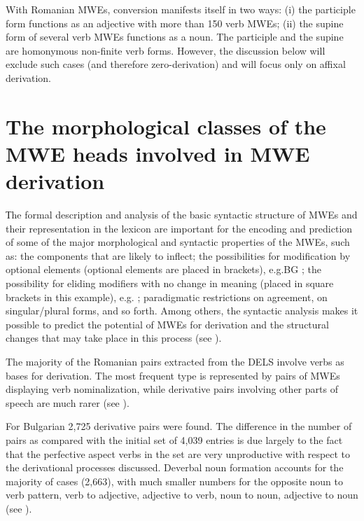 \documentclass[output=paper]{langsci/langscibook}
\begin{document}
With Romanian MWEs, conversion manifests itself in two ways: (i) the
participle form functions as an adjective with more than 150 verb MWEs;
(ii) the supine form of several verb MWEs functions as a noun. The
participle and the supine are homonymous non-finite verb forms.
However, the discussion below will exclude such cases (and therefore
zero-derivation) and will focus only on affixal derivation.



\section{The morphological classes of the MWE heads involved in
MWE derivation}
\label{section5}


Тhe formal description and analysis of the basic syntactic structure of
MWEs and their representation in the lexicon are important for the
encoding and prediction of some of the major morphological and
syntactic properties of the MWEs, such as: the components that are likely to
inflect; the possibilities for modification by optional elements
(optional elements are placed in brackets), e.g.\@ BG ; the possibility for eliding modifiers
with no change in meaning (placed in square brackets in this example),
e.g.\@ 
{}; paradigmatic
restrictions on agreement, on singular/plural forms, and so forth.
Among others, the syntactic analysis makes it possible to predict the
potential of MWEs for derivation and the structural changes that may take place
in this process (see ).



The majority of the Romanian pairs extracted from the DELS involve verbs
as bases for derivation. The most frequent type is represented by pairs
of MWEs displaying verb nominalization, while derivative pairs
involving other parts of speech are much rarer (see ). 



For Bulgarian 2,725 derivative pairs were found. The difference in the
number of pairs as compared with the initial set of 4,039 entries is
due largely to the fact that the perfective aspect verbs in the set are
very unproductive with respect to the derivational processes discussed.
Deverbal noun formation accounts for the majority of cases (2,663),
with much smaller numbers for the opposite noun to verb pattern, verb
to adjective, adjective to verb, noun to noun, adjective to noun (see
 ). 
\end{document}
